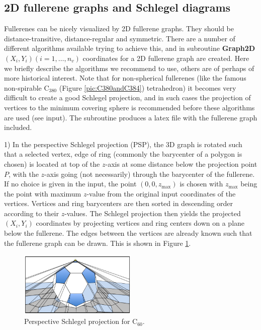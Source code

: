 \documentclass[article,a4paper,twoside]{memoir}
\newcommand{\C}[1]{\ensuremath{\mathrm{C}_{#1}}}
\newcommand{\funname}[1]{{\color{blue}\textbf{#1}}}
\begin{document}
\subsection{2D fullerene graphs and Schlegel diagrams}
Fullerenes can be nicely visualized by 2D fullerene graphs. They should be distance-transitive, distance-regular and 
symmetric. There are a number of different algorithms available trying to achieve this, and in subroutine \funname{Graph2D} $(X_i,Y_i) (i=1,\dots, n_v)$ 
coordinates for a 2D fullerene graph are created. Here we briefly describe the algorithms we recommend to use,
others are of perhaps of more historical interest. Note that for non-spherical fullerenes (like the famous non-spirable \C{380} (Figure  \ref{pic:C380andC384})
tetrahedron) it becomes very difficult to create a good Schlegel projection, and in such cases the projection of vertices to the minimum
covering sphere is recommended before these algorithms are used (see input). The subroutine produces a latex file with the fullerene graph included.

1) In the perspective Schlegel projection (PSP), the 3D graph is rotated such that a selected vertex, edge of ring 
(commonly the barycenter of a polygon is chosen) is located at top of the $z$-axis at some distance below the projection point $P$, 
with the $z$-axis going (not necessarily) through the barycenter of the fullerene. If no choice is given in the input, the point $(0,0,z_{\mathrm{max}})$ 
is chosen with $z_{\mathrm{max}}$ being the point with maximum $z$-value from the original input coordinates of the vertices. 
Vertices and ring barycenters are then sorted in descending order according to their $z$-values.
The Schlegel projection then yields the projected $(X_i,Y_i)$ coordinates by projecting vertices and ring centers 
down on a plane below the fullerene.  The edges between the vertices are already known such that the fullerene graph can be drawn. 
This is shown in Figure \ref{pic:Schlegel}.

 \begin{figure}[htbp]
   	\centering
  	\includegraphics[width=0.5\textwidth]{Schlegel.png}
    \caption{Perspective Schlegel projection for \C{60}.}
	\label{pic:Schlegel}
 \end{figure}
\end{document}
